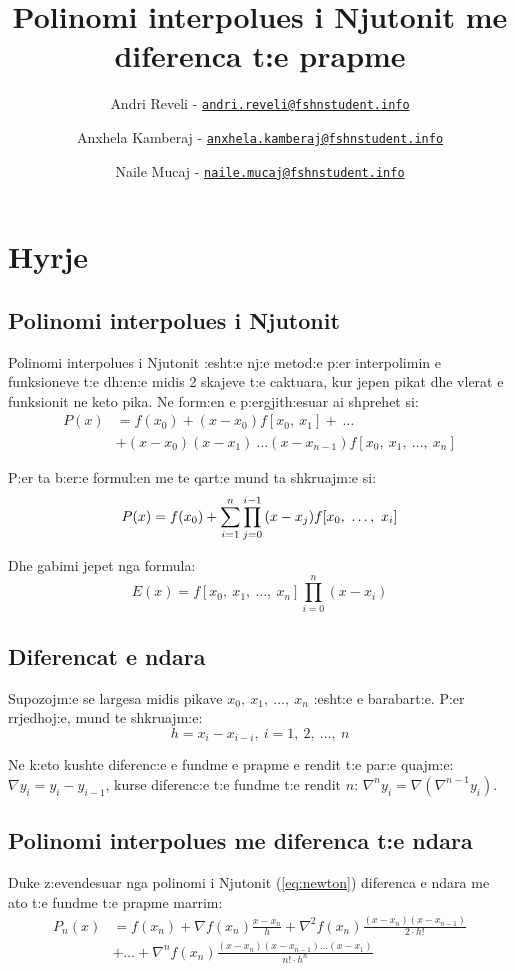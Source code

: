 \documentclass[12pt, margin=1in, a4paper]{article}
\title{Polinomi interpolues i Njutonit me diferenca t:e prapme}
\author{
    Andri Reveli - \href{mailto:andri.reveli@fshnstudent.info}{\texttt{andri.reveli@fshnstudent.info}}
    \and
    Anxhela Kamberaj - \href{mailto:anxhela.kamberaj@fshnstudent.info}{\texttt{anxhela.kamberaj@fshnstudent.info}}
    \and
    Naile Mucaj - \href{mailto:naile.mucaj@fshnstudent.info}{\texttt{naile.mucaj@fshnstudent.info}}
    \and
}
\begin{document}

\tableofcontents
\newpage

\section{Hyrje}
  \subsection{Polinomi interpolues i Njutonit}
  Polinomi interpolues i Njutonit :esht:e nj:e metod:e p:er interpolimin e
  funksioneve t:e dh:en:e midis 2 skajeve t:e caktuara, kur jepen pikat dhe
  vlerat e funksionit ne keto pika. Ne form:en e p:ergjith:esuar ai
  shprehet si:
  \begin{equation}\label{eq:newton}
  \begin{aligned}
    P(x) &= f(x_0) + (x - x_0)f[x_0, \ x_1] + \ \dots \\
    &+ (x - x_0)(x - x_1) \ \dots (x - x_{n - 1})f[x_0, \ x_1, \ \dots, \ x_n]
  \end{aligned}
  \end{equation}

  P:er ta b:er:e formul:en me te qart:e mund ta shkruajm:e si:
  \[
    P(x) = f(x_0) + \sum_{i = 1}^{n}{\prod_{j = 0}^{i - 1}{(x - x_j)}f[x_0, \ \dots, \ x_i]} \\
  \]

  Dhe gabimi jepet nga formula:
  \[
    E(x) = f[x_0, \ x_1, \ \dots, \ x_n]\prod_{i = 0}^n{(x - x_i)}
  \]

  \subsection{Diferencat e ndara}
  Supozojm:e se largesa midis pikave \(x_0, \ x_1, \ \dots, \ x_n\) :esht:e e
  barabart:e. P:er rrjedhoj:e, mund te shkruajm:e:
  \[
    h = x_i - x_{i - i}, \ i = 1, \ 2, \ \dots, \ n
  \]

  Ne k:eto kushte diferenc:e e fundme e prapme e rendit t:e par:e quajm:e:
  \(\nabla y_i = y_i - y_{i - 1}\), kurse diferenc:e t:e fundme t:e rendit \(n\):
  \(\nabla^ny_i = \nabla(\nabla^{n - 1}y_i)\).

  \subsection{Polinomi interpolues me diferenca t:e ndara}
  Duke z:evendesuar nga polinomi i Njutonit (\ref{eq:newton}) diferenca e ndara me
  ato t:e fundme t:e prapme marrim:
  \begin{equation}
  \begin{aligned}
    P_n(x) &= f(x_n) + \nabla f(x_n)\frac{x - x_n}{h} + \nabla^2f(x_n)\frac{(x - x_n)(x - x_{n - 1})}{2 \cdot h!} \\
    &+ \dots + \nabla^n f(x_n)\frac{(x - x_n)(x - x_{n - 1}) \dots (x - x_1)}{n! \cdot h^n}
  \end{aligned}
  \end{equation}
\end{document}
